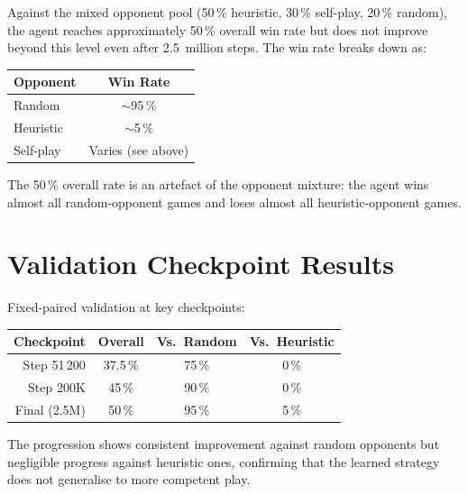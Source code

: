 Against the mixed opponent pool (50\,\% heuristic, 30\,\% self-play, 20\,\%
random), the agent reaches approximately 50\,\% overall win rate but does not
improve beyond this level even after 2.5~million steps.  The win rate breaks
down as:

\begin{center}
\small
\begin{tabularx}{0.7\textwidth}{l c}
  \toprule
  \textbf{Opponent} & \textbf{Win Rate} \\
  \midrule
  Random      & $\sim$95\,\% \\
  Heuristic   & $\sim$5\,\% \\
  Self-play   & Varies (see above) \\
  \bottomrule
\end{tabularx}
\end{center}

The 50\,\% overall rate is an artefact of the opponent mixture: the agent wins
almost all random-opponent games and loses almost all heuristic-opponent games.


\section{Validation Checkpoint Results}

Fixed-paired validation at key checkpoints:

\begin{center}
\small
\begin{tabularx}{\textwidth}{r c c c}
  \toprule
  \textbf{Checkpoint} & \textbf{Overall} & \textbf{Vs.\ Random} & \textbf{Vs.\ Heuristic} \\
  \midrule
  Step 51\,200   & 37.5\,\% & 75\,\%  & 0\,\%  \\
  Step 200K      & 45\,\%   & 90\,\%  & 0\,\%  \\
  Final (2.5M)   & 50\,\%   & 95\,\%  & 5\,\%  \\
  \bottomrule
\end{tabularx}
\end{center}


The progression shows consistent improvement against random opponents but
negligible progress against heuristic ones, confirming that the learned
strategy does not generalise to more competent play.

